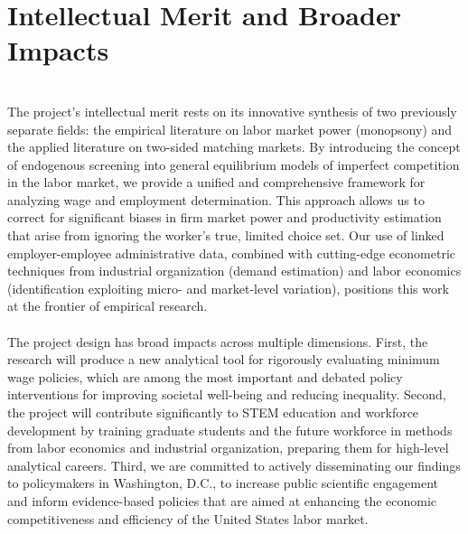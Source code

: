\documentclass[11pt]{article}
\begin{document}

\section{Intellectual Merit and Broader Impacts}
 \\ The project's intellectual merit rests on its innovative synthesis of two previously separate fields: the empirical literature on labor market power (monopsony) and the applied literature on two-sided matching markets. By introducing the concept of endogenous screening into general equilibrium models of imperfect competition in the labor market, we provide a unified and comprehensive framework for analyzing wage and employment determination. This approach allows us to correct for significant biases in firm market power and productivity estimation that arise from ignoring the worker's true, limited choice set. Our use of linked employer-employee administrative data, combined with cutting-edge econometric techniques from industrial organization (demand estimation) and labor economics (identification exploiting micro- and market-level variation), positions this work at the frontier of empirical research. \\
 \\ The project design has broad impacts across multiple dimensions. First, the research will produce a new analytical tool for rigorously evaluating minimum wage policies, which are among the most important and debated policy interventions for improving societal well-being and reducing inequality. Second, the project will contribute significantly to STEM education and workforce development by training graduate students and the future workforce in methods from labor economics and industrial organization, preparing them for high-level analytical careers. Third, we are committed to actively disseminating our findings to policymakers in Washington, D.C., to increase public scientific engagement and inform evidence-based policies that are aimed at enhancing the economic competitiveness and efficiency of the United States labor market.
\end{document}
